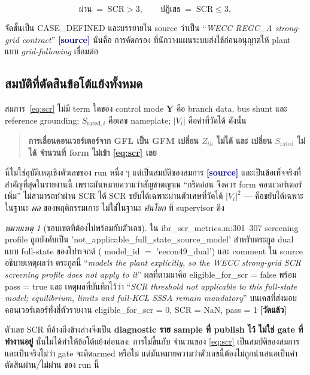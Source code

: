 \documentclass[12pt,a4paper]{article}
\theoremstyle{remark}
\newtheorem{remark}{หมายเหตุ}
\newcommand{\code}[1]{{\ttfamily\small\hyphenchar\font=-1 #1}}
\newcommand{\measured}{\textcolor{ok}{\textbf{[วัดแล้ว]}}}
\newcommand{\sourcecode}{\textcolor{navy}{\textbf{[source]}}}
\begin{document}
\begin{equation}
\text{ผ่าน} \;=\; \mathrm{SCR} > 3,
\qquad
\text{ปฏิเสธ} \;=\; \mathrm{SCR} \le 3,
\label{eq:threshold}
\end{equation}

จัดชั้นเป็น \code{CASE\_DEFINED} และบรรยายใน source ว่าเป็น
``\emph{WECC REGC\_A strong-grid contract}'' \sourcecode{} นั่นคือ การคัดกรอง
ที่นักวางแผนระบบส่งใช้ก่อนอนุญาตให้ plant แบบ \emph{grid-following} เชื่อมต่อ

\subsection{สมบัติที่ตัดสินข้อโต้แย้งทั้งหมด}

สมการ~\eqref{eq:scr} ไม่มี term ใดของ control mode $\mathbf{Y}$ คือ branch data,
bus shunt และ reference grounding; $S_{\mathrm{rated},i}$ คือเลข nameplate;
$|V_i|$ คือค่าที่วัดได้ ดังนั้น

\begin{quote}
\textbf{การเลื่อนคอนเวอร์เตอร์จาก GFL เป็น GFM เปลี่ยน $Z_{th}$ ไม่ได้ และ
เปลี่ยน $S_{\mathrm{rated}}$ ไม่ได้ จำนวนที่ form ไม่เข้า
\eqref{eq:scr} เลย}
\end{quote}

นี่ไม่ใช่อุบัติเหตุเชิงตัวเลขของ run หนึ่ง ๆ แต่เป็นสมบัติของสมการ \sourcecode{}
และเป็นข้อเท็จจริงที่สำคัญที่สุดในรายงานนี้ เพราะมันหมายความว่าสัญชาตญาณ
``กริดอ่อน จึงควร form คอนเวอร์เตอร์เพิ่ม'' ไม่สามารถทำผ่าน SCR ได้
SCR ขยับได้เฉพาะผ่านตัวเศษที่วัดได้ $|V_i|^2$ --- คือขยับได้เฉพาะในฐานะ
\emph{ผล} ของพฤติกรรมเกาะ ไม่ใช่ในฐานะ \emph{คันโยก} ที่ supervisor ดึง

\begin{remark}[ขอบเขตที่ต้องไปพร้อมกับตัวเลข]
ใน \code{ibr\_scr\_metrics.m:301--307} screening profile ถูกบังคับเป็น
\code{'not\_applicable\_full\_state\_source\_model'} สำหรับตระกูล dual แบบ
full-state ของโปรเจกต์ (\code{model\_id} $=$ \code{'eecon49\_dual'}) และ
comment ใน source อธิบายเหตุผลว่า ตระกูลนี้ ``\emph{models the plant explicitly,
so the WECC strong-grid SCR screening profile does not apply to it}''
ผลที่ตามมาคือ \code{eligible\_for\_scr = false} พร้อม \code{pass = true} และ
เหตุผลที่บันทึกไว้ว่า ``\emph{SCR threshold not applicable to this full-state
model; equilibrium, limits and full-KCL SSSA remain mandatory}'' บนเคสที่ส่งมอบ
คอนเวอร์เตอร์ทั้งสี่ตัวรายงาน \code{eligible\_for\_scr = 0}, \code{SCR = NaN},
\code{pass = 1} \measured

ตัวเลข SCR ที่อ้างถึงข้างล่างจึงเป็น \textbf{diagnostic ราย sample ที่ publish
ไว้ ไม่ใช่ gate ที่ทำงานอยู่} นั่นไม่ได้ทำให้ข้อโต้แย้งอ่อนลง: การไม่ขึ้นกับ
จำนวนของ \eqref{eq:scr} เป็นสมบัติของสมการ และเป็นจริงไม่ว่า gate จะติดarmed
หรือไม่ แต่มันหมายความว่าตัวเลขนี้ต้องไม่ถูกนำเสนอเป็นคำตัดสินผ่าน/ไม่ผ่าน
ของ run นี้
\end{remark}
\end{document}
